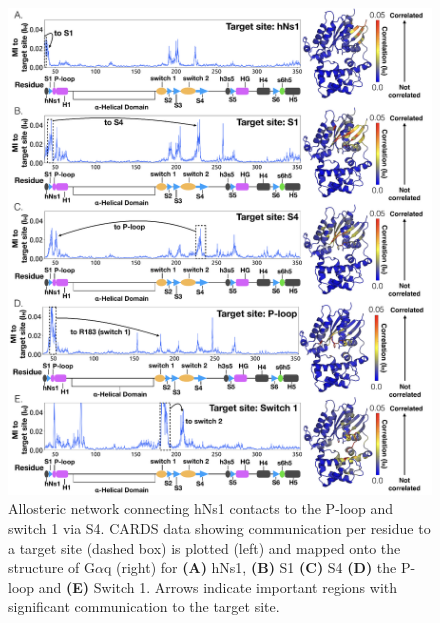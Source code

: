 \documentclass[../main.tex]{subfiles}
\begin{document}
    \begin{figure}[!htb] %
        \centering
        \includegraphics[width=5.6in]{ch4-fig7-supp1.png}
        \caption[Allosteric network connecting hNs1 contacts to the P-loop and switch 1 via S4.]
            {Allosteric network connecting hNs1 contacts to the P-loop and switch 1 via S4. CARDS data showing communication per residue to a target site (dashed box) is plotted (left) and mapped onto the structure of G$\alpha$q (right) for \textbf{(A)} hNs1, \textbf{(B)} S1 \textbf{(C)} S4 \textbf{(D)} the P-loop and \textbf{(E)} Switch 1. Arrows indicate important regions with significant communication to the target site.}
        \label{fig:ch4-fig7-supp1}
    \end{figure}
\end{document}

